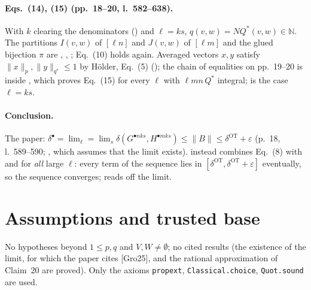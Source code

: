 \paragraph{Eqs.~(14), (15) (pp.~18--20, l.~582--638).} With $k$ clearing the denominators () and
$\ell=ks$, $q(v,w)=NQ^*(v,w)\in\mathbb N$. The partitions $I(v,w)$ of $[\ell n]$ and $J(v,w)$ of $[\ell m]$
and the glued bijection $\pi$ are , ,
; Eq.~(10) holds again. Averaged vectors $x,y$ satisfy $\|x\|_p,\|y\|_{q^*}\le1$ by
H\"older, Eq.~(5) (); the chain of equalities on pp.~19--20 is  inside
, which proves Eq.~(15) for every $\ell$ with $\ell mn\,Q^*$ integral;  is the case $\ell=ks$.

\paragraph{Conclusion.} The paper: $\delta^\bullet=\lim_\ell=\lim_s\delta(G^{\bullet nks},H^{\bullet mks})\le\|B\|\le\delta^{\mathrm{OT}}+\varepsilon$
(p.~18, l.~589--590; , which assumes that the limit exists).  instead combines
Eq.~(8) with  and  for \emph{all} large $\ell$: every term of the sequence
lies in $[\delta^{\mathrm{OT}},\delta^{\mathrm{OT}}+\varepsilon]$ eventually, so the sequence converges; 
reads off the limit.

\section{Assumptions and trusted base}
No hypotheses beyond $1\le p,q$ and $V,W\neq\emptyset$; no cited results (the existence of the limit, for which the
paper cites [Gro25], and the rational approximation of Claim~20 are proved). Only the axioms
\texttt{propext}, \texttt{Classical.choice}, \texttt{Quot.sound} are used.

